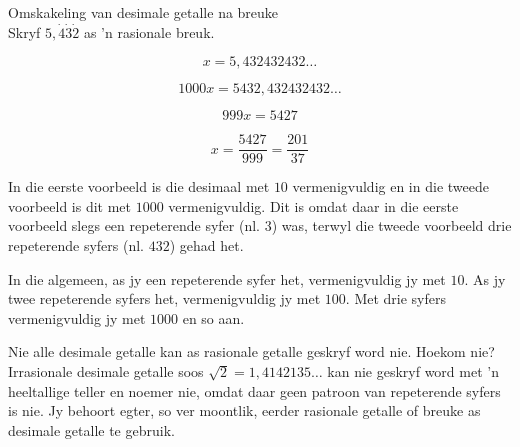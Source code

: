 \begin{wex}
{%
Omskakeling van desimale getalle na breuke
}
{%
\\Skryf $5,\dot{4}\dot{3}\dot{2}$ as 'n rasionale breuk.
}
{%


$$ x = 5,432432432\ldots $$


$$ 1000x = 5432,432432432\ldots $$


$$ 999x = 5427 $$


$$ x = \dfrac{5427}{999} = \dfrac{201}{37} $$

}
\end{wex}

In die eerste voorbeeld is die desimaal met $10$  vermenigvuldig en in die tweede voorbeeld is dit met $1000$ vermenigvuldig. Dit is omdat daar in die eerste voorbeeld slegs een repeterende syfer (nl. $3$) was, terwyl die tweede voorbeeld drie repeterende syfers (nl. $432$) gehad het.\par 
In die algemeen, as jy een repeterende syfer het, vermenigvuldig jy met $10$.  As jy twee repeterende syfers het, vermenigvuldig jy met $100$.  Met drie syfers vermenigvuldig jy met $1000$ en so aan.\par

Nie alle desimale getalle kan as rasionale getalle geskryf word nie. Hoekom nie? Irrasionale desimale getalle soos
$\sqrt{2}=1,4142135\ldots$
kan nie geskryf word met ’n heeltallige teller en noemer nie, omdat daar geen patroon van repeterende syfers is nie. Jy behoort egter, so ver moontlik, eerder rasionale getalle of breuke as desimale getalle te gebruik.






